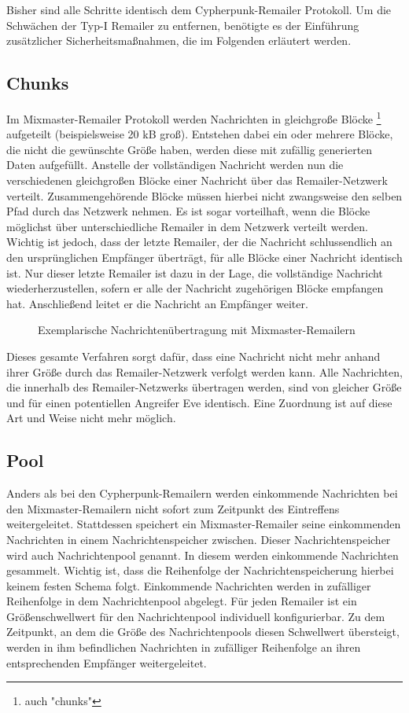 Bisher sind alle Schritte identisch dem Cypherpunk-Remailer Protokoll. Um die Schwächen der Typ-I Remailer zu entfernen, benötigte es der Einführung zusätzlicher Sicherheitsmaßnahmen, die im Folgenden erläutert werden.

\subsection{Chunks}
Im Mixmaster-Remailer Protokoll werden Nachrichten in gleichgroße Blöcke \footnote{auch "chunks"} aufgeteilt (beispielsweise 20 kB groß). Entstehen dabei ein oder mehrere Blöcke, die nicht die gewünschte Größe haben, werden diese mit zufällig generierten Daten aufgefüllt. Anstelle der vollständigen Nachricht werden nun die verschiedenen gleichgroßen Blöcke einer Nachricht über das Remailer-Netzwerk verteilt. Zusammengehörende Blöcke müssen hierbei nicht zwangsweise den selben Pfad durch das Netzwerk nehmen. Es ist sogar vorteilhaft, wenn die Blöcke möglichst über unterschiedliche Remailer in dem Netzwerk verteilt werden. Wichtig ist jedoch, dass der letzte Remailer, der die Nachricht schlussendlich an den ursprünglichen Empfänger überträgt, für alle Blöcke einer Nachricht identisch ist. Nur dieser letzte Remailer ist dazu in der Lage, die vollständige Nachricht wiederherzustellen, sofern er alle der Nachricht zugehörigen Blöcke empfangen hat. Anschließend leitet er die Nachricht an Empfänger weiter.

\begin{figure}
	\begin{center}
		\def\svgwidth{0.9 \linewidth}
		
		\caption{Exemplarische Nachrichtenübertragung mit Mixmaster-Remailern}
	\end{center}
\end{figure}

Dieses gesamte Verfahren sorgt dafür, dass eine Nachricht nicht mehr anhand ihrer Größe durch das Remailer-Netzwerk verfolgt werden kann. Alle Nachrichten, die innerhalb des Remailer-Netzwerks übertragen werden, sind von gleicher Größe und für einen potentiellen Angreifer Eve identisch. Eine Zuordnung ist auf diese Art und Weise nicht mehr möglich.

\subsection{Pool}
Anders als bei den Cypherpunk-Remailern werden einkommende Nachrichten bei den Mixmaster-Remailern nicht sofort zum Zeitpunkt des Eintreffens weitergeleitet. Stattdessen speichert ein Mixmaster-Remailer seine einkommenden Nachrichten in einem Nachrichtenspeicher zwischen. Dieser Nachrichtenspeicher wird auch Nachrichtenpool genannt. In diesem werden einkommende Nachrichten gesammelt. Wichtig ist, dass die Reihenfolge der Nachrichtenspeicherung hierbei keinem festen Schema folgt. Einkommende Nachrichten werden in zufälliger Reihenfolge in dem Nachrichtenpool abgelegt. Für jeden Remailer ist ein Größenschwellwert für den Nachrichtenpool individuell konfigurierbar. Zu dem Zeitpunkt, an dem die Größe des Nachrichtenpools diesen Schwellwert übersteigt, werden in ihm befindlichen Nachrichten in zufälliger Reihenfolge an ihren entsprechenden Empfänger weitergeleitet. 

